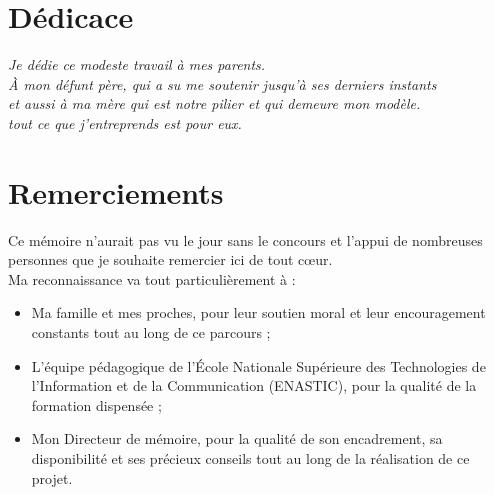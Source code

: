 \documentclass[12pt,a4paper]{report}
\begin{document}
\chapter*{Dédicace}
\begin{onehalfspace}
\vspace*{3cm}
\begin{center}
\textit{Je dédie ce modeste travail à mes parents.}\\[0.5cm]
\textit{À mon défunt père, qui a su me soutenir jusqu'à ses derniers instants}\\
\textit{et aussi à ma mère qui est notre pilier et qui demeure mon modèle.}\\[1cm]
\textit{tout ce que j'entreprends est pour eux.}\\[1cm]
\end{center}
\end{onehalfspace}
\newpage

\chapter*{Remerciements}
\begin{onehalfspace}
Ce mémoire n'aurait pas vu le jour sans le concours et l'appui de nombreuses
personnes que je souhaite remercier ici de tout cœur.\\

Ma reconnaissance va tout particulièrement à :

\begin{itemize}
  \item[\ding{43}] Ma famille et mes proches, pour leur soutien moral et
  leur encouragement constants tout au long de ce parcours ;
  \item[\ding{43}] L'équipe pédagogique de l'École Nationale Supérieure des
  Technologies de l'Information et de la Communication (ENASTIC), pour la
  qualité de la formation dispensée ;
  \item[\ding{43}] Mon Directeur de mémoire, pour la qualité de son
  encadrement, sa disponibilité et ses précieux conseils tout au long de la
  réalisation de ce projet.
\end{itemize}
\end{onehalfspace}
\newpage
\end{document}
